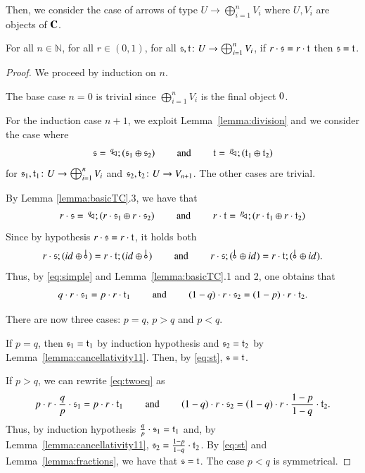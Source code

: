 Then, we consider the case of arrows of type $U \to \bigoplus_{i=1}^n V_i$ where $U,V_i$ are objects of $\mathbf{C}$.
\begin{lemma}\label{lemma:cancellativityhalf}
For all $n \in \mathbb{N}$, for all $r\in (0,1)$, for all $\mathfrak{s},\mathfrak{t} \colon U \to \bigoplus_{i=1}^n V_i$, 
if $r\cdot \mathfrak{s} = r\cdot \mathfrak{t}$ then $\mathfrak{s} = \mathfrak{t}$.
\end{lemma}
\begin{proof}
We proceed by induction on $n$. 

The base case $n=0$ is trivial since $\bigoplus_{i=1}^n V_i$ is the final object $0$.

For the induction case $n+1$, we exploit Lemma~\ref{lemma:division} and we consider the case where
\begin{equation}\label{eq:st}
\mathfrak{s}=\, ^q\!\! \lhd_{} ; (\mathfrak{s}_1 \oplus \mathfrak{s}_2)   \qquad \text{ and } \qquad \mathfrak{t} =\, ^p\!\! \lhd_{}; (\mathfrak{t}_1 \oplus \mathfrak{t}_2)
\end{equation}
for $\mathfrak{s}_1, \mathfrak{t}_1 \colon U \to \bigoplus_{i=1}^n V_i$ and $\mathfrak{s}_2,\mathfrak{t}_2 \colon U \to V_{n+1}$. The other cases are trivial.

By Lemma \ref{lemma:basicTC}.3, we have that
\begin{equation}\label{eq:simple}
r\cdot \mathfrak{s}=\, ^q\!\! \lhd_{} ; (r\cdot \mathfrak{s}_1 \oplus r\cdot \mathfrak{s}_2)   \qquad \text{ and } \qquad r\cdot  \mathfrak{t} =\, ^p\!\! \lhd_{}; (r\cdot \mathfrak{t}_1 \oplus r\cdot \mathfrak{t}_2)
\end{equation}
Since by hypothesis $r\cdot \mathfrak{s} = r \cdot \mathfrak{t}$, it holds both  
\[r\cdot \s ; (\id{} \oplus \bang{}) = r \cdot \t ; (\id{} \oplus \bang{}) \qquad \text{ and } \qquad r\cdot \s ; ( \bang{} \oplus \id{}) = r \cdot \t ;( \bang{} \oplus \id{})\text{.}\]
Thus, by \eqref{eq:simple} and Lemma~\ref{lemma:basicTC}.1 and 2, one obtains that
\begin{equation}\label{eq:twoeq}q\cdot r \cdot \mathfrak{s}_1 = p \cdot r \cdot \mathfrak{t}_1 \qquad \text{ and } \qquad (1-q) \cdot r \cdot \mathfrak{s}_2 = (1-p) \cdot r \cdot \mathfrak{t}_2\text{.}\end{equation}

There are now three cases: $p=q$, $p>q$ and $p<q$.

If $p=q$, then  $\mathfrak{s}_1=\mathfrak{t}_1$ by induction hypothesis and  $\mathfrak{s}_2=\mathfrak{t}_2$ by Lemma~\ref{lemma:cancellativity11}. Then, by \eqref{eq:st}, $\mathfrak{s}=\mathfrak{t}$.

If $p>q$, we can rewrite \eqref{eq:twoeq} as
\begin{equation*}p\cdot r \cdot \frac{q}{p} \cdot \mathfrak{s}_1 = p \cdot r \cdot \mathfrak{t}_1 \qquad \text{ and } \qquad (1-q) \cdot r \cdot \mathfrak{s}_2 = (1-q) \cdot r \cdot \frac{1-p}{1-q} \cdot \mathfrak{t}_2\text{.}\end{equation*}
Thus, by induction hypothesis $ \frac{q}{p} \cdot \mathfrak{s}_1 = \mathfrak{t}_1$ and, by Lemma~\ref{lemma:cancellativity11}, $\mathfrak{s}_2 =\frac{1-p}{1-q} \cdot \mathfrak{t}_2$. By \eqref{eq:st} and Lemma~\ref{lemma:fractions}, we have that $\mathfrak{s}=\mathfrak{t}$.
The case $p<q$ is symmetrical.
\end{proof}

